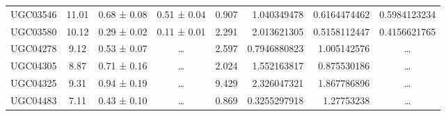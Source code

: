 \documentclass[reprint,%
 amsmath,amssymb,
 aps,
]{revtex4-1}
\begin{document}
\begin{table}[]
\begin{tabular}{cccccrrc}
\rowcolor[HTML]{F3F3F3} 
UGC03546             & 11.01                     & 0.68 ± 0.08           & 0.51 ± 0.04            & 0.907                                                        & 1.040349478                                                           & 0.6164474462                                                          & \multicolumn{1}{r}{\cellcolor[HTML]{F3F3F3}0.5984123234}      \\
\rowcolor[HTML]{F3F3F3} 
UGC03580             & 10.12                     & 0.29 ± 0.02           & 0.11 ± 0.01            & 2.291                                                        & 2.013621305                                                           & 0.5158112447                                                          & \multicolumn{1}{r}{\cellcolor[HTML]{F3F3F3}0.4156621765}      \\
\rowcolor[HTML]{F3F3F3} 
UGC04278             & 9.12                      & 0.53 ± 0.07           & …                      & 2.597                                                        & 0.7946880823                                                          & 1.005142576                                                           & …                                                             \\
\rowcolor[HTML]{F3F3F3} 
UGC04305             & 8.87                      & 0.71 ± 0.16           & …                      & 2.024                                                        & 1.552163817                                                           & 0.875530186                                                           & …                                                             \\
\rowcolor[HTML]{F3F3F3} 
UGC04325             & 9.31                      & 0.94 ± 0.19           & …                      & 9.429                                                        & 2.326047321                                                           & 1.867786896                                                           & …                                                             \\
\rowcolor[HTML]{F3F3F3} 
UGC04483             & 7.11                      & 0.43 ± 0.10           & …                      & 0.869                                                        & 0.3255297918                                                          & 1.27753238                                                            & …                                                             \\

\end{tabular}
\end{table}
\end{document}
